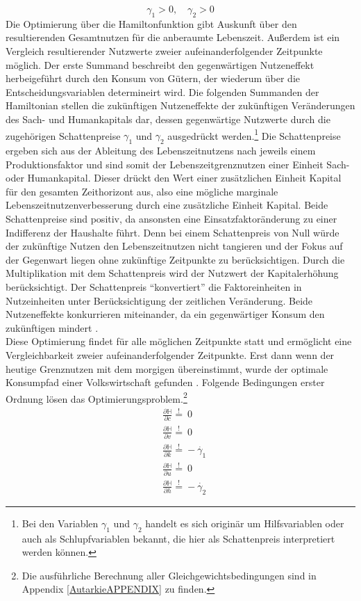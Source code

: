 %
\begin{displaymath}
	\gamma_1 > 0,\quad \gamma_2 > 0
\end{displaymath}
%
Die Optimierung über die Hamiltonfunktion gibt Auskunft über den resultierenden Gesamtnutzen für die anberaumte Lebenszeit. Außerdem ist ein Vergleich resultierender Nutzwerte zweier aufeinanderfolgender Zeitpunkte möglich. Der erste Summand beschreibt den gegenwärtigen Nutzeneffekt herbeigeführt durch den Konsum von Gütern, der wiederum über die Entscheidungsvariablen determineirt wird. Die folgenden Summanden der Hamiltonian stellen die zukünftigen Nutzeneffekte der zukünftigen Veränderungen des Sach- und Humankapitals dar, dessen gegenwärtige Nutzwerte durch die zugehörigen Schattenpreise $\gamma_1$ und $\gamma_2$ ausgedrückt werden.\footnote{Bei den Variablen $\gamma_1$ und $\gamma_2$ handelt es sich originär um Hilfsvariablen oder auch als Schlupfvariablen bekannt, die hier als Schattenpreis interpretiert werden können.} Die Schattenpreise ergeben sich aus der Ableitung des Lebenszeitnutzens nach jeweils einem Produktionsfaktor und sind somit der Lebenszeitgrenznutzen einer Einheit Sach- oder Humankapital. Dieser drückt den Wert einer zusätzlichen Einheit Kapital für den gesamten Zeithorizont aus, also eine mögliche marginale Lebenszeitnutzenverbesserung durch eine zusätzliche Einheit Kapital.  Beide Schattenpreise sind positiv, da ansonsten eine Einsatzfaktoränderung zu einer Indifferenz der Haushalte führt. Denn bei einem Schattenpreis von Null würde der zukünftige Nutzen den Lebenszeitnutzen nicht tangieren und der Fokus auf der Gegenwart liegen ohne zukünftige Zeitpunkte zu berücksichtigen. Durch die Multiplikation mit dem Schattenpreis wird der Nutzwert der Kapitalerhöhung berücksichtigt. Der Schattenpreis "`konvertiert"' die Faktoreinheiten in Nutzeinheiten unter Berücksichtigung der zeitlichen Veränderung. Beide Nutzeneffekte konkurrieren miteinander, da ein gegenwärtiger Konsum den zukünftigen mindert \cite{Chiang.2000,Chiang.2011}.\\
% 
Diese Optimierung findet für alle möglichen Zeitpunkte statt und ermöglicht eine Vergleichbarkeit zweier aufeinanderfolgender Zeitpunkte. Erst dann wenn der heutige Grenznutzen mit dem morgigen übereinstimmt, wurde der optimale Konsumpfad einer Volkswirtschaft gefunden \cite{Chiang.2000}. Folgende Bedingungen erster Ordnung lösen das Optimierungsproblem.\footnote{Die ausführliche Berechnung aller Gleichgewichtsbedingungen sind in Appendix \ref{AutarkieAPPENDIX} zu finden.}  
%
\begin{align}
	&\frac{\partial\mathbb{H}}{\partial c}\overset{!}{=}~0\label{eq:foc1WM}\\
	&\frac{\partial\mathbb{H}}{\partial v}\overset{!}{=}~0\label{eq:foc2WM}\\
	&\frac{\partial\mathbb{H}}{\partial k}\overset{!}{=}-\dot{\gamma_1}\label{eq:foc3WM}\\
	&\frac{\partial\mathbb{H}}{\partial u}\overset{!}{=}~0\label{eq:foc4WM}\\
	&\frac{\partial\mathbb{H}}{\partial h}\overset{!}{=}-\dot{\gamma_2}\label{eq:foc5WM}
\end{align}
